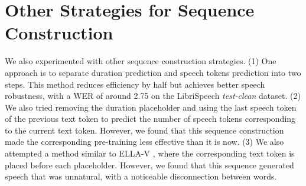 \section{Other Strategies for Sequence Construction}
We also experimented with other sequence construction strategies. (1) One approach is to separate duration prediction and speech tokens prediction into two steps. This method reduces efficiency by half but achieves better speech robustness, with a WER of around 2.75 on the LibriSpeech \textit{test-clean} dataset. (2) We also tried removing the duration placeholder and using the last speech token of the previous text token to predict the number of speech tokens corresponding to the current text token. However, we found that this sequence construction made the corresponding pre-training less effective than it is now. (3) We also attempted a method similar to ELLA-V \cite{ellav}, where the corresponding text token is placed before each placeholder. However, we found that this sequence generated speech that was unnatural, with a noticeable disconnection between words.